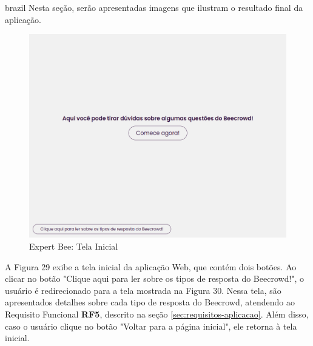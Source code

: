 \begin{otherlanguage*}{brazil}
Nesta seção, serão apresentadas imagens que ilustram o resultado final da aplicação.

\begin{figure}[H]
    \centering
            \caption{Expert Bee: Tela Inicial}
            \label{fig:ModeloConceitual}
        \includegraphics[scale=0.41]{pictures/desenvolvimento/expert_bee_tela_inicial.png}
\end{figure}

A Figura 29 exibe a tela inicial da aplicação Web, que contém dois botões. Ao clicar no botão "Clique aqui para ler sobre os tipos de resposta do Beecrowd!", o usuário é redirecionado para a tela mostrada na Figura 30. Nessa tela, são apresentados detalhes sobre cada tipo de resposta do Beecrowd, atendendo ao Requisito Funcional \textbf{RF5}, descrito na seção \ref{sec:requisitos-aplicacao}. Além disso, caso o usuário clique no botão "Voltar para a página inicial", ele retorna à tela inicial.


\end{otherlanguage*}
